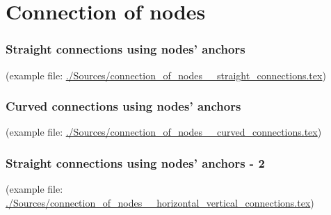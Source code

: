 \section{Connection of nodes}
\label{sec:connection_of_nodes}




\begin{frame}
	\frametitle{Straight connections using nodes' anchors}
	(example file: \url{./Sources/connection_of_nodes__straight_connections.tex})
	
\end{frame}





\begin{frame}
	\frametitle{Curved connections using nodes' anchors}
	(example file: \url{./Sources/connection_of_nodes__curved_connections.tex})
	
\end{frame}






\begin{frame}
	\frametitle{Straight connections using nodes' anchors - 2}
	\small{(example file: \url{./Sources/connection_of_nodes__horizontal_vertical_connections.tex})}
	
\end{frame}




